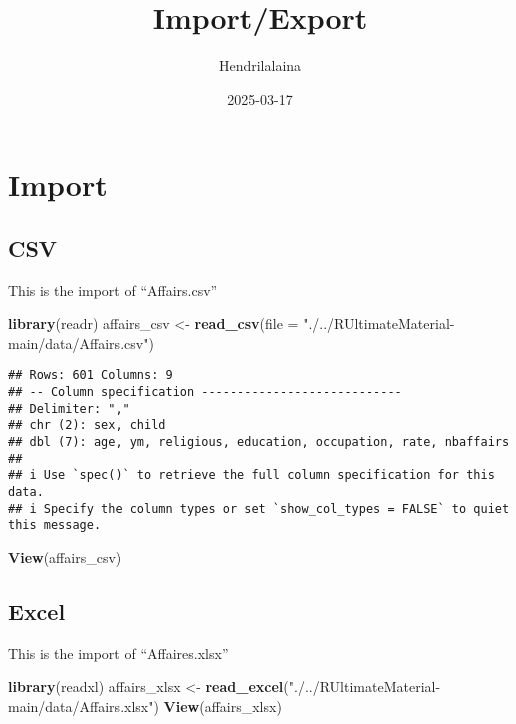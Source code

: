 \documentclass[
]{article}
\title{Import/Export}
\author{Hendrilalaina}
\date{2025-03-17}
\newenvironment{Shaded}{\begin{snugshade}}{\end{snugshade}}
\newcommand{\AttributeTok}[1]{\textcolor[rgb]{0.13,0.29,0.53}{#1}}
\newcommand{\FunctionTok}[1]{\textcolor[rgb]{0.13,0.29,0.53}{\textbf{#1}}}
\newcommand{\NormalTok}[1]{#1}
\newcommand{\OtherTok}[1]{\textcolor[rgb]{0.56,0.35,0.01}{#1}}
\newcommand{\StringTok}[1]{\textcolor[rgb]{0.31,0.60,0.02}{#1}}
\begin{document}
\maketitle

\section{Import}\label{import}

\subsection{CSV}\label{csv}

This is the import of ``Affairs.csv''

\begin{Shaded}
\begin{Highlighting}[]
\FunctionTok{library}\NormalTok{(readr)}
\NormalTok{affairs\_csv }\OtherTok{\textless{}{-}} \FunctionTok{read\_csv}\NormalTok{(}\AttributeTok{file =} \StringTok{"./../RUltimateMaterial{-}main/data/Affairs.csv"}\NormalTok{)}
\end{Highlighting}
\end{Shaded}

\begin{verbatim}
## Rows: 601 Columns: 9
## -- Column specification ----------------------------
## Delimiter: ","
## chr (2): sex, child
## dbl (7): age, ym, religious, education, occupation, rate, nbaffairs
## 
## i Use `spec()` to retrieve the full column specification for this data.
## i Specify the column types or set `show_col_types = FALSE` to quiet this message.
\end{verbatim}

\begin{Shaded}
\begin{Highlighting}[]
\FunctionTok{View}\NormalTok{(affairs\_csv)}
\end{Highlighting}
\end{Shaded}

\subsection{Excel}\label{excel}

This is the import of ``Affaires.xlsx''

\begin{Shaded}
\begin{Highlighting}[]
\FunctionTok{library}\NormalTok{(readxl)}
\NormalTok{affairs\_xlsx }\OtherTok{\textless{}{-}} \FunctionTok{read\_excel}\NormalTok{(}\StringTok{"./../RUltimateMaterial{-}main/data/Affairs.xlsx"}\NormalTok{)}
\FunctionTok{View}\NormalTok{(affairs\_xlsx)}
\end{Highlighting}
\end{Shaded}
\end{document}

